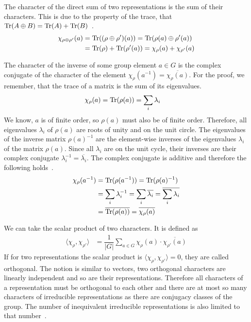 The character of the direct sum of two representations is the sum of their characters.
This is due to the property of the trace, that $\operatorname{Tr}(A \oplus B) = \operatorname{Tr}(A) + \operatorname{Tr}(B)$~\cite{fulton2013}.
\begin{subequations}
\begin{align}
    \chi_{\rho \oplus \rho'}(a) & = \operatorname{Tr}((\rho \oplus \rho')(a)) = \operatorname{Tr}(\rho(a) \oplus \rho'(a)) \\
    & = \operatorname{Tr}(\rho) + \operatorname{Tr}(\rho'(a)) = \chi_\rho(a) + \chi_{\rho'}(a)
\end{align}
\end{subequations}

The character of the inverse of some group element $a \in G$ is the complex conjugate of the character of the element $\chi_\rho(a^{-1}) = \overline{\chi_\rho(a)}$.
For the proof, we remember, that the trace of a matrix is the sum of its eigenvalues.
\begin{align}
    \chi_\rho(a) & = \operatorname{Tr}(\rho(a)) = \sum_i \lambda_i
\end{align}
We know, $a$ is of finite order, so $\rho(a)$ must also be of finite order.
Therefore, all eigenvalues $\lambda_i$ of $\rho(a)$ are roots of unity and on the unit circle.
The eigenvalues of the inverse matrix $\rho(a)^{-1}$ are the element-wise inverses of the eigenvalues $\lambda_i$ of the matrix $\rho(a)$.
Since all $\lambda_i$ are on the unit cycle, their inverses are their complex conjugate $\lambda_i^{-1} = \overline{\lambda_i}$.
The complex conjugate is additive and therefore the following holds~\cite{fulton2013}.
\begin{subequations}
\begin{align}
    \chi_\rho(a^{-1}) & = \operatorname{Tr}(\rho(a^{-1})) = \operatorname{Tr}(\rho(a)^{-1}) \\
    & = \sum_i \lambda_i^{-1} = \sum_i \overline{\lambda_i} = \overline{\sum_i \lambda_i} \\
    & = \overline{\operatorname{Tr}(\rho(a))} = \overline{\chi_\rho(a)}
\end{align}
\end{subequations}

We can take the scalar product of two characters.
It is defined as
\begin{align}
    \langle \chi_\rho, \chi_{\rho'} \rangle & = \dfrac{1}{|G|} \sum_{a \in G} \chi_\rho(a) \cdot \overline{\chi_{\rho'}(a)}
\end{align}
If for two representations the scalar product is $\langle \chi_\rho, \chi_{\rho'} \rangle = 0$, they are called orthogonal.
The notion is similar to vectors, two orthogonal characters are linearly independent and so are their representations.
Therefore all characters of a representation must be orthogonal to each other and there are at most so many characters of irreducible representations as there are conjugacy classes of the group.
The number of inequivalent irreducible representations is also limited to that number~\cite{fulton2013}.

